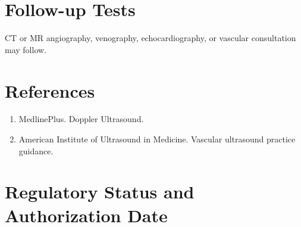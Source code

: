 \section*{Follow-up Tests} CT or MR angiography, venography, echocardiography, or vascular consultation may follow.
\section*{References} \begin{enumerate}\item MedlinePlus. Doppler Ultrasound.\item American Institute of Ultrasound in Medicine. Vascular ultrasound practice guidance.\end{enumerate}
\clearpage\section*{Regulatory Status and Authorization Date}\clearpage
